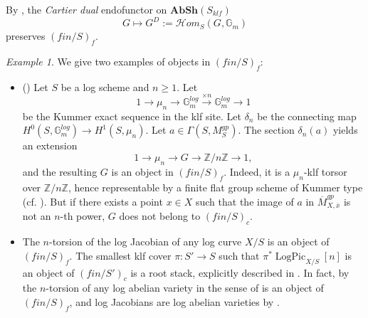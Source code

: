 \documentclass[a4paper,11pt]{amsart} %
\numberwithin{equation}{subsection}
\newcommand{\on}[1]{\operatorname{#1}}
\newcommand{\bb}[1]{{\mathbb{#1}}}
\newcommand{\bd}[1]{{\mathbf{#1}}}
\def\sheafhom{\mathcal{H}om}
\newcommand{\cat}[1]{\bd{#1}}
\theoremstyle{definition}
\theoremstyle{plain}%
\theoremstyle{remark}
\newtheorem{example}[definition]{Example}
\begin{document}
By \cite[\S 1.5]{katoJuin}, the \emph{Cartier dual} endofunctor on $\cat{AbSh}(S_{klf})$
\begin{equation*}
    G \mapsto G^D:=\sheafhom_S(G,\bb G_m)
\end{equation*}
preserves $(fin/S)_f$. \\



\begin{example} We give two examples of objects in $(fin/S)_f$:\\
\begin{itemize} 
    \item (\cite[\S 1.8]{katoJuin})  Let $S$ be a log scheme and $n \geq 1$. Let 
    $$1 \to \mu_n \to \mathbb{G}_m^{log} \xrightarrow{\times n} \mathbb{G}_m^{log} \to 1$$
    be the Kummer exact sequence in the klf site. Let $\delta_n$ be the connecting map $H^0(S, \mathbb{G}_m^{log}) \to H^1(S,\mu_n)$. Let $a \in \Gamma(S,M_S^{gp})$. The section $\delta_n(a)$ yields an extension
    $$ 1 \to \mu_n \to G \to \mathbb{Z}/n\mathbb{Z} \to 1,$$ 
and the resulting $G$ is an object in $(fin/S)_f$. Indeed, it is a $\mu_n$-klf torsor over $\mathbb{Z}/n\mathbb{Z}$, hence representable by a finite flat group scheme of Kummer type (cf. \cite[Theorem 9.1]{katoLogStructuresII}). But if there exists a point $x \in X$ such that the image of $a$ in $\overline{M}_{X,\overline{x}}^{gp}$ is not an $n$-th power, $G$ does not belong to $(fin/S)_c$.
    \item The $n$-torsion of the log Jacobian of any log curve $X/S$ is an object of $(fin/S)_f$. The smallest klf cover $\pi \colon S' \to S$ such that $\pi^*\on{LogPic}_{X/S}[n]$ is an object of $(fin/S')_c$ is a root stack, explicitly described in \cite[Section 4.2]{Holmes2022Logarithmic-mod}. In fact, by \cite[Proposition 4.5]{katoJuin} the $n$-torsion of any log abelian variety in the sense of \cite{IIKajiwara2008Logarithmic-a} is an object of $(fin/S)_f$, and log Jacobians are log abelian varieties by \cite[Theorem 4.15.7]{molcho_wise_2022}.
\end{itemize}
   
\end{example}
\end{document}
